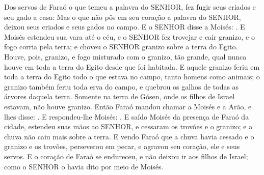 {  Dos servos de Faraó o que temeu a palavra do SENHOR, fez fugir seus criados e seu gado a casa:
  Mas o que não pôs em seu coração a palavra do SENHOR, deixou seus criados e seus gados no campo.
  E o SENHOR disse a Moisés: .
  E Moisés estendeu sua vara até o céu, e o SENHOR fez trovejar e cair granizo, e o fogo corria pela terra; e choveu o SENHOR granizo sobre a terra do Egito.
  Houve, pois, granizo, e fogo misturado com o granizo, tão grande, qual nunca houve em toda a terra do Egito desde que foi habitada.
  E aquele granizo feriu em toda a terra do Egito todo o que estava no campo, tanto homens como animais; o granizo também feriu toda erva do campo, e quebrou os galhos de todas as árvores daquela terra.
  Somente na terra de Gósen, onde os filhos de Israel estavam, não houve granizo.
  Então Faraó mandou chamar a Moisés e a Arão, e lhes disse: .
  E respondeu-lhe Moisés: .
  E saído Moisés da presença de Faraó da cidade, estendeu suas mãos ao SENHOR, e cessaram os trovões e o granizo; e a chuva não caiu mais sobre a terra.
  E vendo Faraó que a chuva havia cessado e o granizo e os trovões, perseverou em pecar, e agravou seu coração, ele e seus servos.
  E o coração de Faraó se endureceu, e não deixou ir aos filhos de Israel; como o SENHOR o havia dito por meio de Moisés.
\par }

